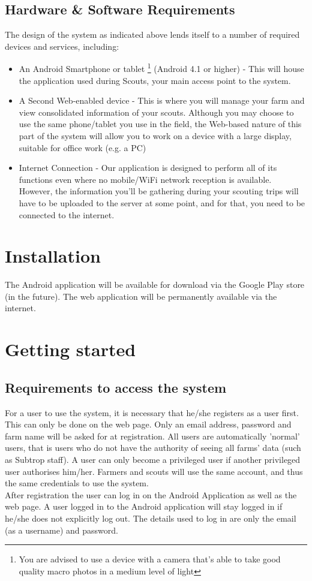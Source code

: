 \documentclass[11pt,a4paper,titlepage]{article}
\begin{document}
\subsection{Hardware \& Software Requirements}
The design of the system as indicated above lends itself to a number of required devices and services, including:
	\begin{itemize}
		\item An Android Smartphone or tablet \footnote{You are advised to use a device with a camera that's able to take good quality macro photos in a medium level of light} (Android 4.1 or higher) - This will house the application used during Scouts, your main access point to the system.
		\item A Second Web-enabled device - This is where you will manage your farm and view consolidated information of your scouts. Although you may choose to use the same phone/tablet you use in the field, the Web-based nature of this part of the system will allow you to work on a device with a large display, suitable for office work (e.g. a PC)
		\item Internet Connection - Our application is designed to perform all of its functions even where no mobile/WiFi network reception is available. However, the information you'll be gathering during your scouting trips will have to be uploaded to the server at some point, and for that, you need to be connected to the internet. 
	\end{itemize}



\section{Installation}
The Android application will be available for download via the Google Play store (in the future). The web application will be permanently available via the internet.
		
\section{Getting started}
\subsection{Requirements to access the system}
For a user to use the system, it is necessary that he/she registers as a user first. This can only be done on the web page. Only an email address, password and farm name will be asked for at registration. All users are automatically 'normal' users, that is users who do not have the authority of seeing all farms' data (such as Subtrop staff). A user can only become a privileged user if another privileged user authorises him/her. Farmers and scouts will use the same account, and thus the same credentials to use the system.\\
After registration the user can log in on the Android Application as well as the web page. A user logged in to the Android application will stay logged in if he/she does not explicitly log out. The details used to log in are only the email (as a username) and password.
\end{document}
